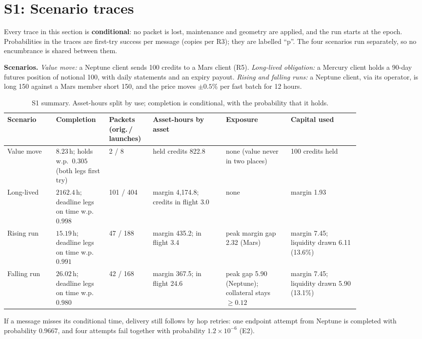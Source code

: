 \documentclass[11pt]{article}
\theoremstyle{definition}
\theoremstyle{remark}
\newcommand{\h}{\,\mathrm{h}}
\begin{document}
\section{S1: Scenario traces}\label{app:s1}
Every trace in this section is \textbf{conditional}: no packet is lost, maintenance and geometry are applied, and the run starts at the epoch. Probabilities in the traces are first-try success per message (copies per R3); they are labelled ``p''. The four scenarios run separately, so no encumbrance is shared between them.

\textbf{Scenarios.} \emph{Value move:} a Neptune client sends 100 credits to a Mars client (R5). \emph{Long-lived obligation:} a Mercury client holds a 90-day futures position of notional 100, with daily statements and an expiry payout. \emph{Rising and falling runs:} a Neptune client, via its operator, is long 150 against a Mars member short 150, and the price moves $\pm0.5\%$ per fast batch for 12 hours.

\begin{table}[H]
\centering
\caption{S1 summary. Asset-hours split by use; completion is conditional, with the probability that it holds.}\label{tab:s1sum}
\small
\begin{tabular}{@{}p{0.12\linewidth}p{0.12\linewidth}p{0.09\linewidth}p{0.18\linewidth}p{0.16\linewidth}p{0.17\linewidth}@{}}
\toprule
Scenario & Completion & Packets (orig.\,/ launches) & Asset-hours by asset & Exposure & Capital used \\
\midrule
Value move & $8.23\h$; holds w.p.\ $0.305$ (both legs first try) & 2 / 8 & held credits 822.8 & none (value never in two places) & 100 credits held \\
Long-lived & $2162.4\h$; deadline legs on time w.p.\ $0.998$ & 101 / 404 & margin 4{,}174.8; credits in flight 3.0 & none & margin 1.93 \\
Rising run & $15.19\h$; deadline legs on time w.p.\ $0.991$ & 47 / 188 & margin 435.2; in flight 3.4 & peak margin gap 2.32 (Mars) & margin 7.45; liquidity drawn 6.11 (13.6\%) \\
Falling run & $26.02\h$; deadline legs on time w.p.\ $0.980$ & 42 / 168 & margin 367.5; in flight 24.6 & peak gap 5.90 (Neptune); collateral stays $\ge0.12$ & margin 7.45; liquidity drawn 5.90 (13.1\%) \\
\bottomrule
\end{tabular}
\end{table}
If a message misses its conditional time, delivery still follows by hop retries: one endpoint attempt from Neptune is completed with probability $0.9667$, and four attempts fail together with probability $1.2\times10^{-6}$ (E2).
\end{document}
